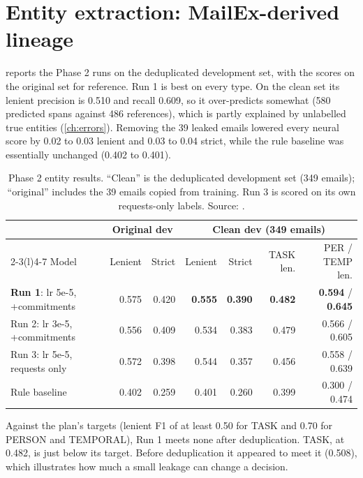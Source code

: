 \section{Entity extraction: MailEx-derived lineage}
\label{sec:resphase2}
 reports the Phase 2 runs on the deduplicated development set, with the scores on the original set for reference. Run 1 is best on every type. On the clean set its lenient precision is 0.510 and recall 0.609, so it over-predicts somewhat (580 predicted spans against 486 references), which is partly explained by unlabelled true entities (\cref{ch:errors}). Removing the 39 leaked emails lowered every neural score by 0.02 to 0.03 lenient and 0.03 to 0.04 strict, while the rule baseline was essentially unchanged (0.402 to 0.401).

\begin{table}[h]
\centering
\caption[Entity results, MailEx-derived lineage]{Phase 2 entity results. ``Clean'' is the deduplicated development set (349 emails); ``original'' includes the 39 emails copied from training. Run 3 is scored on its own requests-only labels. Source: .}
\label{tab:resphase2}
\footnotesize
\begin{tabular}{@{}lrrrrrr@{}}
\toprule
 & \multicolumn{2}{c}{Original dev} & \multicolumn{4}{c}{Clean dev (349 emails)} \\
\cmidrule(lr){2-3}\cmidrule(l){4-7}
Model & Lenient & Strict & Lenient & Strict & TASK len. & PER / TEMP len. \\
\midrule
\textbf{Run 1}: lr 5e-5, +commitments & 0.575 & 0.420 & \textbf{0.555} & \textbf{0.390} & \textbf{0.482} & \textbf{0.594} / \textbf{0.645} \\
Run 2: lr 3e-5, +commitments & 0.556 & 0.409 & 0.534 & 0.383 & 0.479 & 0.566 / 0.605 \\
Run 3: lr 5e-5, requests only & 0.572 & 0.398 & 0.544 & 0.357 & 0.456 & 0.558 / 0.639 \\
Rule baseline & 0.402 & 0.259 & 0.401 & 0.260 & 0.399 & 0.300 / 0.474 \\
\bottomrule
\end{tabular}
\end{table}

Against the plan's targets (lenient F1 of at least 0.50 for TASK and 0.70 for PERSON and TEMPORAL), Run 1 meets none after deduplication. TASK, at 0.482, is just below its target. Before deduplication it appeared to meet it (0.508), which illustrates how much a small leakage can change a decision.

